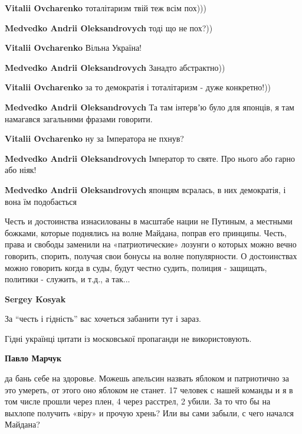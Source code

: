 \begin{itemize}
\begin{itemize}
\textbf{Vitalii Ovcharenko} тоталітаризм твій теж всім пох)))

\textbf{Medvedko Andrii Oleksandrovych} тоді що не пох?))

\textbf{Vitalii Ovcharenko} Вільна Україна!

\textbf{Medvedko Andrii Oleksandrovych} Занадто абстрактно))

\textbf{Vitalii Ovcharenko} за то демократія і тоталітаризм - дуже конкретно!))

\textbf{Medvedko Andrii Oleksandrovych} Та там інтервʼю було для японців, я там намагався загальними фразами говорити.

\textbf{Vitalii Ovcharenko} ну за Імператора не пхнув?

\textbf{Medvedko Andrii Oleksandrovych} Імператор то святе. Про нього або гарно або ніяк!

\textbf{Medvedko Andrii Oleksandrovych} японцям всралась, в них демократія, і вона їм подобається
\end{itemize} %


Честь и достоинства изнасилованы в масштабе нации не Путиным, а местными
божками, которые поднялись на волне Майдана, поправ его принципы. Честь, права
и свободы заменили на «патриотические» лозунги о которых можно вечно говорить,
спорить, получая свои бонусы на волне популярности. О достоинствах можно
говорить когда в суды, будут честно судить, полиция - защищать, политики -
служить, и т.д., а так...

\begin{itemize} %
\textbf{Sergey Kosyak} 

За \enquote{честь і гідність} вас хочеться забанити тут і зараз.

Гідні українці цитати із московської пропаганди не використовують.


\textbf{Павло Марчук} 

да бань себе на здоровье. Можешь апельсин назвать яблоком и патриотично за это
умереть, от этого оно яблоком не станет. 17 человек с нашей команды и я в том
числе прошли через плен, 4 через расстрел, 2 убили. За то что бы на выхлопе
получить «віру» и прочую хрень? Или вы сами забыли, с чего начался Майдана?


\end{itemize}
\end{itemize}
